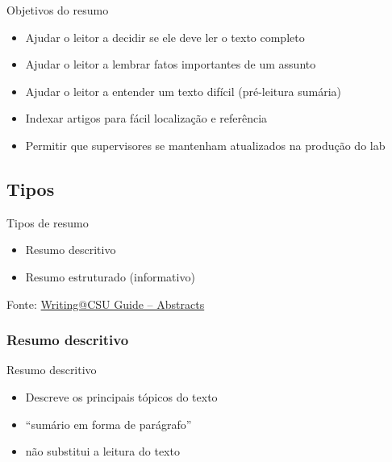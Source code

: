 \documentclass{beamer}
\begin{document}
\begin{frame}{Objetivos do resumo}
  \begin{itemize}
    \footnotesize
  \item Ajudar o leitor a decidir se ele deve ler o texto completo
    \bigskip


  \item Ajudar o leitor a lembrar fatos importantes de um assunto
    \bigskip


  \item Ajudar o leitor a entender um texto difícil (pré-leitura
    sumária)
    \bigskip

  \item Indexar artigos para fácil localização e referência
    \bigskip

  \item Permitir que supervisores se mantenham atualizados na produção
    do lab
  \end{itemize}
\end{frame}

\subsection{Tipos}

\begin{frame}{Tipos de resumo}
  \begin{itemize}
    \footnotesize
  \item Resumo descritivo
    \bigskip
    \bigskip
  \item Resumo estruturado (informativo)
  \end{itemize}

  \vfill
  \scriptsize
  \hfill Fonte: \href{https://writing.colostate.edu/guides/guide.cfm?guideid=59}{Writing@CSU Guide -- Abstracts}
\end{frame}

\subsubsection[Descritivo]{Resumo descritivo}

\begin{frame}{Resumo descritivo}
  \begin{itemize}
    \footnotesize
  \item Descreve os principais tópicos do texto
    \bigskip
  \item ``sumário em forma de parágrafo''
    \bigskip
  \item não substitui a leitura do texto
  \end{itemize}
\end{frame}
\end{document}
